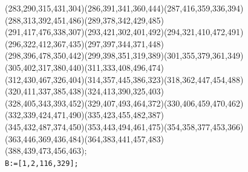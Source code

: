 \documentclass[a4paper,twopage,reqno,12pt]{amsart}
\theoremstyle{definition}
\numberwithin{equation}{section}
\begin{document}
\begin{enumerate}
{{(283,290,315,431,304)(286,391,341,360,444)(287,416,359,336,394)(288,313,392,451,486)(289,378,342,429,485)\\
(291,417,476,338,307)(293,421,302,401,492)(294,321,410,472,491)(296,322,412,367,435)(297,397,344,371,448)\\
(298,396,478,350,442)(299,398,351,319,389)(301,355,379,361,349)(305,402,317,380,440)(311,333,408,496,474)\\
(312,430,467,326,404)(314,357,445,386,323)(318,362,447,454,488)(320,411,337,385,438)(324,413,390,325,403)\\
(328,405,343,393,452)(329,407,493,464,372)(330,406,459,470,462)(332,339,424,471,490)(335,423,455,482,387)\\
(345,432,487,374,450)(353,443,494,461,475)(354,358,377,453,366)(363,446,369,436,484)(364,383,441,457,483)\\
(388,439,473,456,463);\\}
}
 \texttt{B:=[1,2,116,329];}\\   



\end{enumerate}
\end{document}
